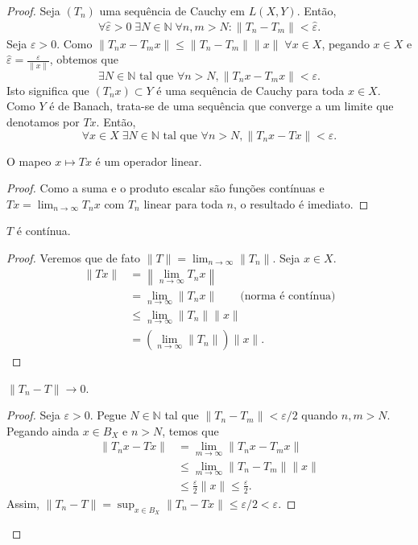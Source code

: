 \documentclass[portuguese]{article}
\theoremstyle{definition}
\newcommand{\N}{\mathbb{N}}
\begin{document}
	\begin{proof}
		Seja $(T_n)$ uma sequência de Cauchy em $L(X,Y)$. Então,
		\begin{gather*}
			\forall\hat\varepsilon>0\;\exists N\in\N\;\forall n,m>N:\| T_n-T_m\|<\hat\varepsilon.
		\end{gather*}
		Seja $\varepsilon>0$. Como $\| T_nx-T_mx\|\leq\| T_n-T_m\|\| x\|\;\forall x\in X$, pegando $x\in X$ e $\hat\varepsilon=\frac{\varepsilon}{\| x\|}$, obtemos que
		\[\exists N\in\N\text{ tal que }\forall n>N, \| T_nx-T_mx\|<\varepsilon.\]
		Isto significa que $(T_nx)\subset Y$ é uma sequência de Cauchy para toda $x\in X$. Como $Y$ é de Banach, trata-se de uma sequência que converge a um limite que denotamos por $Tx$. Então,
		\[\forall x\in X\;\exists N\in\N\text{ tal que }\forall n>N, \| T_nx-Tx\|<\varepsilon.\]
		
		
		
		
		\begin{af*}
			O mapeo $x\mapsto Tx$ é um operador linear.
		\end{af*}
		\begin{proof}
			Como a suma e o produto escalar são funções contínuas e $Tx=\lim_{n\to\infty}T_nx$ com $T_n$ linear para toda $n$, o resultado é imediato.
		\end{proof}
		
		\begin{af*}
			$T$ é contínua.
		\end{af*}
		\begin{proof}
			Veremos que de fato $\| T\|=\lim_{n\to\infty}\| T_n\|$. Seja $x\in X$.
			\begin{align*}
				\| Tx\|&=\left\| \lim_{n\to\infty}T_nx\right\|\\
				&=\lim_{n\to\infty}\| T_nx\|\qquad\text{(norma é contínua)}\\
				&\leq\lim_{n\to\infty}\| T_n\|\| x\|\\
				&=\left(\lim_{n\to\infty}\| T_n\|\right)\| x\|.
			\end{align*}
		\end{proof}
		
		\begin{af*}
			$\| T_n-T\|\to0$.
		\end{af*}
		\begin{proof}
			Seja $\varepsilon>0$. Pegue $N\in\N$ tal que $\| T_n-T_m\|<\varepsilon/2$ quando $n,m>N$. Pegando ainda $x\in B_X$ e $n>N$, temos que
			\begin{align*}
				\| T_nx-Tx\|&=\lim_{m\to\infty}\| T_nx-T_mx\|\\
				&\leq\lim_{m\to\infty}\| T_n-T_m\|\| x\|\\
				&\leq\frac{\varepsilon}{2}\| x\|\leq\frac{\varepsilon}{2}.
			\end{align*}
			Assim, $\| T_n-T\|=\sup_{x\in B_X}\| T_n-Tx\|\leq\varepsilon/2<\varepsilon$.
		\end{proof}
	\end{proof}
	
\end{document}
